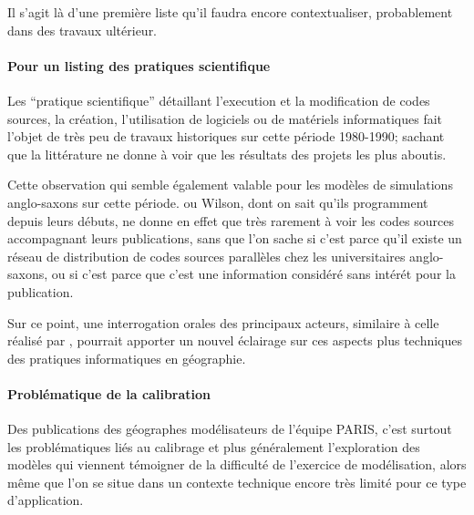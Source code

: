 Il s'agit là d'une première liste qu'il faudra encore contextualiser, probablement dans des travaux ultérieur.

\paragraph{Pour un listing des pratiques scientifique }

Les \enquote{pratique scientifique} détaillant l’execution et la modification de codes sources, la création, l'utilisation de logiciels ou de matériels informatiques fait l'objet de très peu de travaux historiques sur cette période 1980-1990; sachant que la littérature ne donne à voir que les résultats des projets les plus aboutis.

Cette observation qui semble également valable pour les modèles de simulations anglo-saxons sur cette période. \textcite{Batty2014} ou Wilson, dont on sait qu'ils programment depuis leurs débuts, ne donne en effet que très rarement à voir les codes sources accompagnant leurs publications, sans que l’on sache si c’est parce qu’il existe un réseau de distribution de codes sources parallèles chez les universitaires anglo-saxons, ou si c’est parce que c’est une information considéré sans intérét pour la publication.

Sur ce point, une interrogation orales des principaux acteurs, similaire à celle réalisé par \textcite{Cuyala2014}, pourrait apporter un nouvel éclairage sur ces aspects plus techniques des pratiques informatiques en géographie.

\paragraph{Problématique de la calibration}

Des publications des géographes modélisateurs de l’équipe PARIS, c’est surtout les problématiques liés au calibrage et plus généralement l’exploration des modèles qui viennent témoigner de la difficulté de l'exercice de modélisation, alors même que l'on se situe dans un contexte technique encore très limité pour ce type d’application. 

